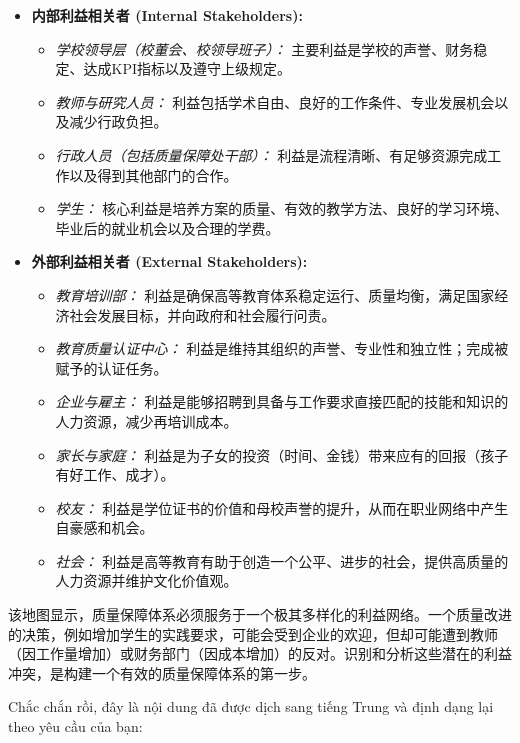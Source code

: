 \begin{itemize}
    \item \textbf{内部利益相关者 (Internal Stakeholders):}
        \begin{itemize}
            \item \textit{学校领导层（校董会、校领导班子）：} 主要利益是学校的声誉、财务稳定、达成KPI指标以及遵守上级规定。
            \item \textit{教师与研究人员：} 利益包括学术自由、良好的工作条件、专业发展机会以及减少行政负担。
            \item \textit{行政人员（包括质量保障处干部）：} 利益是流程清晰、有足够资源完成工作以及得到其他部门的合作。
            \item \textit{学生：} 核心利益是培养方案的质量、有效的教学方法、良好的学习环境、毕业后的就业机会以及合理的学费。
        \end{itemize}
    \item \textbf{外部利益相关者 (External Stakeholders):}
        \begin{itemize}
            \item \textit{教育培训部：} 利益是确保高等教育体系稳定运行、质量均衡，满足国家经济社会发展目标，并向政府和社会履行问责。
            \item \textit{教育质量认证中心：} 利益是维持其组织的声誉、专业性和独立性；完成被赋予的认证任务。
            \item \textit{企业与雇主：} 利益是能够招聘到具备与工作要求直接匹配的技能和知识的人力资源，减少再培训成本。
            \item \textit{家长与家庭：} 利益是为子女的投资（时间、金钱）带来应有的回报（孩子有好工作、成才）。
            \item \textit{校友：} 利益是学位证书的价值和母校声誉的提升，从而在职业网络中产生自豪感和机会。
            \item \textit{社会：} 利益是高等教育有助于创造一个公平、进步的社会，提供高质量的人力资源并维护文化价值观。
        \end{itemize}
\end{itemize}
该地图显示，质量保障体系必须服务于一个极其多样化的利益网络。一个质量改进的决策，例如增加学生的实践要求，可能会受到企业的欢迎，但却可能遭到教师（因工作量增加）或财务部门（因成本增加）的反对。识别和分析这些潜在的利益冲突，是构建一个有效的质量保障体系的第一步。




Chắc chắn rồi, đây là nội dung đã được dịch sang tiếng Trung và định dạng lại theo yêu cầu của bạn:

